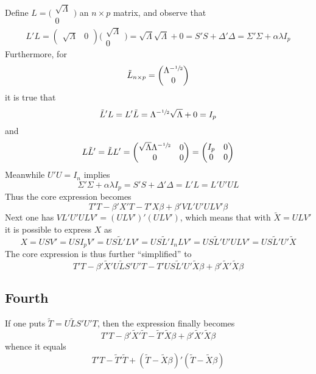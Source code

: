 \documentclass[a4paper]{article}
\begin{document}
Define $L = \big(\begin{smallmatrix} \sqrt{\Lambda} \\ 0 \end{smallmatrix}\big)$ an $n\times p$ matrix, and observe that
\[L'L = (\begin{smallmatrix}\sqrt{\Lambda} & 0\end{smallmatrix})\Big(\begin{smallmatrix}\sqrt{\Lambda} \\ 0\end{smallmatrix}\Big) = \sqrt{\Lambda}\sqrt{\Lambda} + 0 = S'S + \Delta'\Delta = \Sigma'\Sigma + \alpha \lambda I_p\]
Furthermore, for
\[\tilde{L}_{n\times p} = \bigg(\begin{matrix}\Lambda^{-\sfrac{1}{2}} \\ 0\end{matrix}\bigg)\]
it is true that
\[\tilde{L}'L = L'\tilde{L} = \Lambda^{-\sfrac{1}{2}} \sqrt{\Lambda} + 0 = I_p\]
and
\[L\tilde{L}' = \tilde{L} L'= \bigg(\begin{matrix} \sqrt{\Lambda}\Lambda^{-\sfrac{1}{2}} & 0 \\ 0 & 0\end{matrix}\bigg) = \bigg(\begin{matrix} I_p & 0 \\ 0 & 0\end{matrix}\bigg)\]
Meanwhile $U'U = I_n$ implies
\[ \Sigma'\Sigma + \alpha \lambda I_p = S'S + \Delta'\Delta = L'L = L'U'UL \]
Thus the core expression becomes
\[T'T - \beta'X'T - T'X\beta + \beta'VL'U'ULV'\beta \]
Next one has $VL'U'ULV' = (ULV')'(ULV')$, which means that with $\tilde{X} = ULV'$ it is possible to express $X$ as
\[X = USV' = USI_pV' = US\tilde{L}'LV' = US\tilde{L}'I_nLV' = US\tilde{L}'U'ULV' = US\tilde{L}'U'\tilde{X}\]
The core expression is thus further ``simplified'' to
\[T'T - \beta'\tilde{X}'U\tilde{L}S'U'T - T'US\tilde{L}'U'\tilde{X}\beta + \beta'\tilde{X}'\tilde{X}\beta \]


\subsection*{Fourth} %
\label{sub:fourth}
If one puts $\tilde{T} = U\tilde{L}S'U'T$, then the expression finally becomes
\[T'T - \beta'\tilde{X}'\tilde{T} - \tilde{T}'\tilde{X}\beta + \beta'\tilde{X}'\tilde{X}\beta\]
whence it equals
\[ T'T - \tilde{T}'\tilde{T} + (\tilde{T} - \tilde{X}\beta)'(\tilde{T} - \tilde{X}\beta) \]
\end{document}
